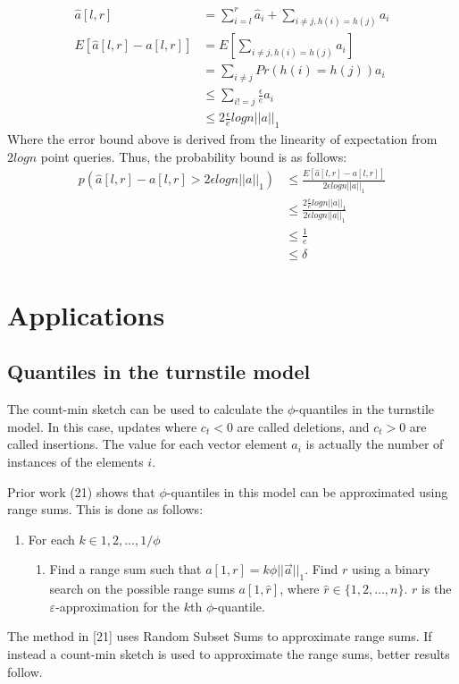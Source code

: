 \documentclass[11pt]{article}
\begin{document}
\begin{align*}
    \hat a[l,r] &= \sum_{i = l}^r \hat a_i + \sum_{i \neq j, h(i)=h(j)} a_i\\
    E[\hat a[l,r] - a[l,r]] &= E[\sum_{i \neq j, h(i)=h(j)} a_i]\\
    &= \sum_{i \neq j}Pr(h(i) = h(j)) a_i\\
    &\leq \sum_{i!=j} \frac{\epsilon}{e} a_i\\
    &\leq 2\frac{\epsilon}{e} logn ||a||_1
\end{align*}
Where the error bound above is derived from the linearity of expectation from $2logn$ point queries. Thus, the probability bound is as follows:
\begin{align*}
    p(\hat a[l,r] - a[l,r] > 2\epsilon logn ||a||_1) &\leq \frac{E[\hat a[l,r] - a[l,r]]}{2\epsilon logn||a||_1}\\
    &\leq \frac{2\frac{\epsilon}{e}logn ||a||_1}{2\epsilon logn ||a||_1}\\
    &\leq \frac{1}{e}\\
    &\leq \delta
\end{align*}
\section{Applications}

\subsection{Quantiles in the turnstile model}
The count-min sketch can be used to calculate the $\phi$-quantiles in the turnstile model.
In this case, updates where $c_t < 0$ are called deletions, and $c_t > 0$ are called insertions.
The value for each vector element $a_i$ is actually the number of instances of the elements
$i$.

Prior work (21) shows that $\phi$-quantiles in this model can be approximated using range sums. This is done
as follows:
\begin{enumerate}
    \item For each $k \in {1, 2, \dots, 1/\phi}$
    \begin{enumerate}
        \item Find a range sum such that $a[1, r] = k\phi||\vec{a}||_1$. Find $r$ using a binary
        search on the possible range sums $a[1, \hat{r}]$, where $\hat{r} \in \{1, 2, \dots, n\}$.  $r$ is the
        $\varepsilon$-approximation for the $k$th $\phi$-quantile.
    \end{enumerate}
\end{enumerate}
The method in [21] uses Random Subset Sums to approximate range sums.  If instead a count-min
sketch is used to approximate the range sums, better results follow.  
\end{document}
